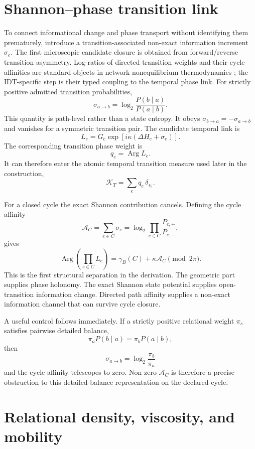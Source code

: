 \section{Shannon--phase transition link}

To connect informational change and phase transport without identifying them prematurely, introduce a transition-associated non-exact information increment $\sigma_e$. The first microscopic candidate closure is obtained from forward/reverse transition asymmetry. Log-ratios of directed transition weights and their cycle affinities are standard objects in network nonequilibrium thermodynamics \cite{Schnakenberg1976}; the IDT-specific step is their typed coupling to the temporal phase link. For strictly positive admitted transition probabilities,
\[
\boxed{
\sigma_{a\to b}
=
\log_2\frac{P(b\mid a)}{P(a\mid b)}.
}
\]
This quantity is path-level rather than a state entropy. It obeys $\sigma_{b\to a}=-\sigma_{a\to b}$ and vanishes for a symmetric transition pair. The candidate temporal link is
\[
\boxed{
L_e
=
G_e\exp\!\left[i\kappa\left(\Delta H_e+\sigma_e\right)\right].
}
\]
The corresponding transition phase weight is
\[
q_e=\operatorname{Arg}L_e.
\]
It can therefore enter the atomic temporal transition measure used later in the construction,
\[
\mathcal K_T=\sum_e q_e\,\delta_{s_e}.
\]

For a closed cycle the exact Shannon contribution cancels. Defining the cycle affinity
\[
\mathcal A_C
=
\sum_{e\in C}\sigma_e
=
\log_2\prod_{e\in C}
\frac{P_{e,+}}{P_{e,-}},
\]
gives
\[
\boxed{
\operatorname{Arg}\!\left(\prod_{e\in C}L_e\right)
=
\gamma_B(C)
+
\kappa\mathcal A_C
\pmod{2\pi}.
}
\]
This is the first structural separation in the derivation. The geometric part supplies phase holonomy. The exact Shannon state potential supplies open-transition information change. Directed path affinity supplies a non-exact information channel that can survive cycle closure.

A useful control follows immediately. If a strictly positive relational weight $\pi_s$ satisfies pairwise detailed balance,
\[
\pi_aP(b\mid a)=\pi_bP(a\mid b),
\]
then
\[
\sigma_{a\to b}=\log_2\frac{\pi_b}{\pi_a}
\]
and the cycle affinity telescopes to zero. Non-zero $\mathcal A_C$ is therefore a precise obstruction to this detailed-balance representation on the declared cycle.

\section{Relational density, viscosity, and mobility}

